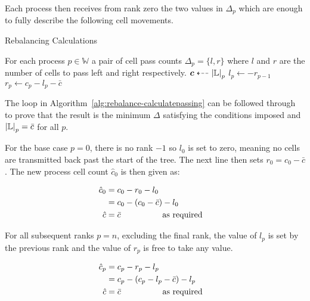 \documentclass[twoside]{IIBproject}
\newcommand{\vect} [1] {\bm{#1}}
\newcommand{\dla}{\dashleftarrow}
\numberwithin{figure}{section}
\begin{document}
            Each process then receives from rank zero the two values in $\Delta_p$ which are enough to fully describe the following cell movements.

            \begin{algorithm}[!htbp]
                \caption{Rebalancing Calculations}
                \label{alg:rebalance-calculatepassing}

                \begin{algorithmic}
                    \Ensure For each process $p \in \mathbb{W}$ a pair of cell pass counts $\Delta_p = \{l,r\}$ where $l$ and $r$ are the number of cells to pass left and right respectively.
                    \Statex
                    \Gather $\vect{c} \dla \abs{\mathbb{L}}_p $
                        \State $l_p \gets -r_{p-1}$
                        \State $r_p \gets c_p - l_p - \bar{c}$
                    \EndFor
                \end{algorithmic}
            \end{algorithm}

            The loop in Algorithm~\ref{alg:rebalance-calculatepassing} can be followed through to prove that the result is the minimum $\Delta$ satisfying the conditions imposed and $\abs{\mathbb{L}}_p=\bar c$ for all $p$.

            For the base case $p=0$, there is no rank $-1$ so $l_0$ is set to zero, meaning no cells are transmitted back past the start of the tree. The next line then sets $r_0 = c_0 - \bar{c}$. The new process cell count $\hat c_0$ is then given as:

            \begin{align}
                \hat c_0&=c_0-r_0-l_0 \\ \nonumber
                        &=c_0-(c_0-\bar{c})-l_0 \\ \nonumber
                \hat c &=\bar c \qquad\qquad\qq{as required}
            \end{align}

            For all subsequent ranks $p=n$, excluding the final rank, the value of $l_p$ is set by the previous rank and the value of $r_p$ is free to take any value. 

            \begin{align}
                \hat c_p&=c_p-r_p-l_p \\ \nonumber
                        &=c_p-(c_p-l_p-\bar{c})-l_p \\ \nonumber
                \hat c &=\bar c \qquad\qquad\qq{as required}
            \end{align}
\end{document}
